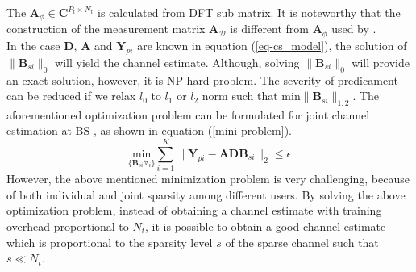 The $\mathbf{A}_{\phi} \in \mathbf{C}^{P_t \times N_t}$ is calculated  from DFT sub matrix. It is noteworthy that the construction of the measurement matrix $\mathbf{A}_{\mathcal{D}}$  is different from $\mathbf{A}_{\phi}$ used by \cite{mainref-joint,mainref-1bit}.\\
In the case $\mathbf{D}$, $\mathbf{A}$ and $\mathbf{Y}_{pi}$ are known in equation (\ref{eq-cs_model}),  the solution of $\|\mathbf{B}_{si}\|_0$  will yield the channel estimate. Although, solving $\|\mathbf{B}_{si}\|_0$ will provide an exact solution, however, it is NP-hard problem. The severity of predicament can be reduced if we relax $l_0$  to $l_1$ or $l_2$ norm such that min$\|\mathbf{B}_{si}\|_{1,2}$.
The aforementioned optimization problem can be formulated
for joint channel estimation at BS \cite{Alesii2015}, as shown in equation (\ref{mini-problem}).
 \begin{equation}
      \underset{\{\mathbf{B}_{si} \forall_i \}}{\text{min} } \sum_{i=1}^K \|\mathbf{Y}_{pi} -\mathbf{A} \mathbf{D} \mathbf{B}_{si}  \|_2 \le \epsilon
     \label{mini-problem}
\end{equation}
However, the above mentioned minimization problem is very challenging, because of both individual and joint sparsity among different users.
By solving the above optimization problem, instead of obtaining a channel estimate with training overhead proportional to $N_t$, it is possible to obtain a good channel estimate which is proportional to the sparsity level $s$ of the sparse channel such that $s \ll N_t$.
